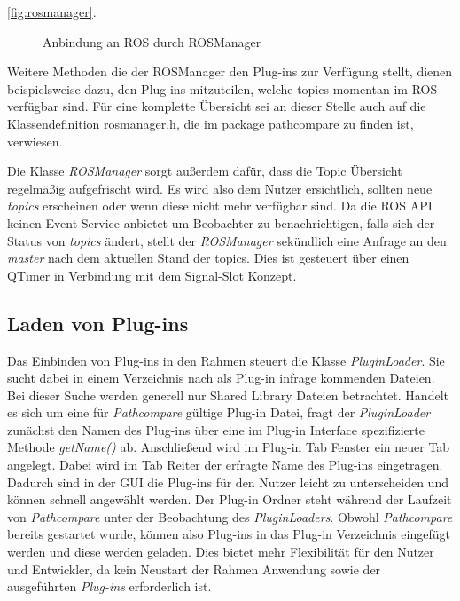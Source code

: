 \autoref{fig:rosmanager}.

\begin{figure}[t]
  \begin{center}
  \end{center}
  \caption{Anbindung an ROS durch ROSManager}
  \label{fig:rosmanager}
\end{figure}

Weitere Methoden die der ROSManager den Plug-ins zur Verfügung stellt, dienen
beispielsweise dazu, den Plug-ins mitzuteilen, welche topics momentan im ROS
verfügbar sind. Für eine komplette Übersicht sei an dieser Stelle auch auf die
Klassendefinition rosmanager.h, die im package pathcompare zu finden ist,
verwiesen.

Die Klasse \textit{ROSManager} sorgt außerdem dafür, dass die Topic Übersicht
regelmäßig aufgefrischt wird. Es wird also dem Nutzer ersichtlich, sollten neue
\textit{topics} erscheinen oder wenn diese nicht mehr verfügbar sind.  Da die
ROS \gls{API} keinen Event Service anbietet um Beobachter zu benachrichtigen,
falls sich der Status von \textit{topics} ändert, stellt der
\textit{ROSManager} sekündlich eine Anfrage an den \textit{master} nach dem
aktuellen Stand der topics.  Dies ist gesteuert über einen QTimer in Verbindung
mit dem Signal-Slot Konzept.

\subsection{Laden von Plug-ins}
Das Einbinden von Plug-ins in den Rahmen steuert die Klasse
\textit{PluginLoader}. Sie sucht dabei in einem Verzeichnis nach als Plug-in
infrage kommenden Dateien. Bei dieser Suche werden generell nur Shared Library
Dateien betrachtet. Handelt es sich um eine für \textit{Pathcompare} gültige
Plug-in Datei, fragt der \textit{PluginLoader} zunächst den Namen des Plug-ins
über eine im Plug-in Interface spezifizierte Methode \textit{getName()} ab.
Anschließend wird im Plug-in Tab Fenster ein neuer Tab angelegt. Dabei wird im
Tab Reiter der erfragte Name des Plug-ins eingetragen. Dadurch sind in der GUI
die Plug-ins für den Nutzer leicht zu unterscheiden und können schnell
angewählt werden.  Der Plug-in Ordner steht während der Laufzeit von
\textit{Pathcompare} unter der Beobachtung des \textit{PluginLoaders}.  Obwohl
\textit{Pathcompare} bereits gestartet wurde, können also Plug-ins in das
Plug-in Verzeichnis eingefügt werden und diese werden geladen. Dies bietet mehr
Flexibilität für den Nutzer und Entwickler, da kein Neustart der Rahmen
Anwendung sowie der ausgeführten \textit{Plug-ins} erforderlich ist.

